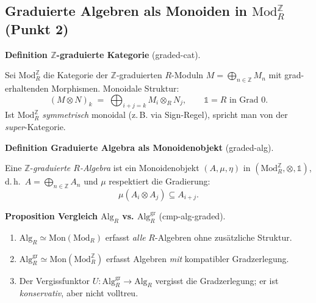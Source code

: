 \documentclass[10pt, letterpaper]{article}
\newcommand{\Mod}{\mathrm{Mod}}
\newcommand{\Alg}{\mathrm{Alg}}
\newcommand{\CustomHeading}[3]{%
  \par\medskip\noindent%
  \textbf{#1 #2} \textnormal{(#3)}.\enskip%
}
\newenvironment{DEF}[2]{\begin{unitbox}\CustomHeading{Definition}{#1}{#2}}{\end{unitbox}}
\newenvironment{PROP}[2]{\begin{unitbox}\CustomHeading{Proposition}{#1}{#2}}{\end{unitbox}}
\begin{document}
\subsection{Graduierte Algebren als Monoiden in \texorpdfstring{\(\Mod_R^{\mathbb{Z}}\)}{ModR^Z} (Punkt 2)}

\begin{DEF}{\(\mathbb{Z}\)-graduierte Kategorie}{graded-cat}
Sei \(\Mod_R^{\mathbb{Z}}\) die Kategorie der \(\mathbb{Z}\)-graduierten \(R\)-Moduln \(M=\bigoplus_{n\in\mathbb{Z}}M_n\)
mit grad-erhaltenden Morphismen. Monoidale Struktur:
\[
(M\otimes N)_k \;=\; \bigoplus_{i+j=k} M_i\otimes_R N_j,\qquad \mathbb{1}=R\text{ in Grad }0.
\]
Ist \(\Mod_R^{\mathbb{Z}}\) \emph{symmetrisch} monoidal (z.\,B. via Sign-Regel), spricht man von der \emph{super}-Kategorie.
\end{DEF}

\begin{DEF}{Graduierte Algebra als Monoidenobjekt}{graded-alg}
Eine \(\mathbb{Z}\)-\emph{graduierte \(R\)-Algebra} ist ein Monoidenobjekt \((A,\mu,\eta)\) in \((\Mod_R^{\mathbb{Z}},\otimes,\mathbb{1})\),
d.\,h.\ \(A=\bigoplus_{n\in\mathbb{Z}}A_n\) und \(\mu\) respektiert die Gradierung:
\[
\mu(A_i\otimes A_j)\subseteq A_{i+j}.
\]
\end{DEF}

\begin{PROP}{Vergleich \(\Alg_R\) vs. \(\Alg_R^{\mathrm{gr}}\)}{cmp-alg-graded}
\begin{enumerate}[leftmargin=*]
  \item \(\Alg_R \simeq \mathrm{Mon}(\Mod_R)\) erfasst \emph{alle} \(R\)-Algebren ohne zusätzliche Struktur.
  \item \(\Alg_R^{\mathrm{gr}} \simeq \mathrm{Mon}(\Mod_R^{\mathbb{Z}})\) erfasst Algebren \emph{mit} kompatibler Gradzerlegung.
  \item Der Vergissfunktor \(U:\Alg_R^{\mathrm{gr}}\to\Alg_R\) vergisst die Gradzerlegung; er ist \emph{konservativ}, aber nicht volltreu.
\end{enumerate}
\end{PROP}
\end{document}
